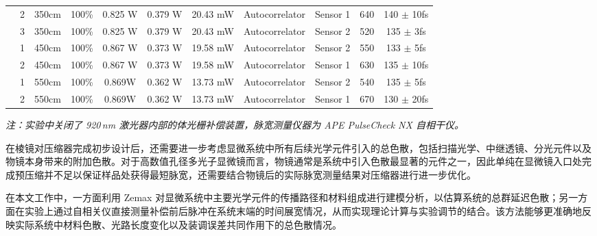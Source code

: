\begin{table}[htbp]
{\begin{tabular}{ccccccccccc}
\rowcolor[HTML]{E7EAED} 
\cellcolor[HTML]{E7EAED} &
  2 &
  \cellcolor[HTML]{83CBEB}350cm &
  100\% &
  0.825 W &
  0.379 W &
  20.43 mW &
  Autocorrelator &
  Sensor 1 &
  640 &
  140 $\pm$ 10fs \\
\rowcolor[HTML]{E7EAED} 
\multirow{-3}{*}{\cellcolor[HTML]{E7EAED}2} &
  3 &
  \cellcolor[HTML]{83CBEB}350cm &
  100\% &
  0.825 W &
  0.379 W &
  20.43 mW &
  Autocorrelator &
  Sensor 2 &
  520 &
  135 $\pm$ 3fs \\ \hline
\rowcolor[HTML]{E7EAED} 
\cellcolor[HTML]{E7EAED} &
  1 &
  \cellcolor[HTML]{E59EDD}450cm &
  100\% &
  0.867 W &
  0.373 W &
  19.58 mW &
  Autocorrelator &
  Sensor 2 &
  550 &
  133 $\pm$ 5fs \\
\rowcolor[HTML]{E7EAED} 
\multirow{-2}{*}{\cellcolor[HTML]{E7EAED}3} &
  2 &
  \cellcolor[HTML]{E59EDD}450cm &
  100\% &
  0.867 W &
  0.373 W &
  19.58 mW &
  Autocorrelator &
  Sensor 1 &
  630 &
  135 $\pm$ 10fs \\ \hline
\rowcolor[HTML]{E7EAED} 
\cellcolor[HTML]{E7EAED} &
  1 &
  \cellcolor[HTML]{8ED973}550cm &
  100\% &
  0.869W &
  0.362 W &
  13.73 mW &
  Autocorrelator &
  Sensor 2 &
  540 &
  135 $\pm$ 5fs \\
\rowcolor[HTML]{E7EAED} 
\multirow{-2}{*}{\cellcolor[HTML]{E7EAED}4} &
  2 &
  \cellcolor[HTML]{8ED973}550cm &
  100\% &
  0.869W &
  0.362 W &
  13.73 mW &
  Autocorrelator &
  Sensor 1 &
  670 &
  130 $\pm$ 20fs \\ \hline
\end{tabular}%
}
\vspace{2mm}
\begin{minipage}{\textwidth}
\footnotesize
\textit{注：实验中关闭了 920\,nm 激光器内部的体光栅补偿装置，脉宽测量仪器为 APE PulseCheck NX 自相干仪。}
\end{minipage}
\end{table}

在棱镜对压缩器完成初步设计后，还需要进一步考虑显微系统中所有后续光学元件引入的总色散，包括扫描光学、中继透镜、分光元件以及物镜本身带来的附加色散。对于高数值孔径多光子显微镜而言，物镜通常是系统中引入色散最显著的元件之一，因此单纯在显微镜入口处完成预压缩并不足以保证样品处获得最短脉宽，还需要结合物镜后的实际脉宽测量结果对压缩器进行进一步优化。

在本文工作中，一方面利用 Zemax 对显微系统中主要光学元件的传播路径和材料组成进行建模分析，以估算系统的总群延迟色散；另一方面在实验上通过自相关仪直接测量补偿前后脉冲在系统末端的时间展宽情况，从而实现理论计算与实验调节的结合。该方法能够更准确地反映实际系统中材料色散、光路长度变化以及装调误差共同作用下的总色散情况。

